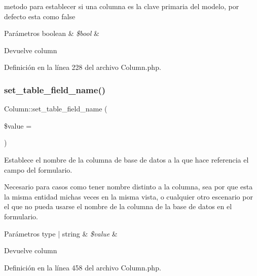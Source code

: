 metodo para establecer si una columna es la clave primaria del modelo, por defecto esta como false


\begin{DoxyParams}[1]{Parámetros}
boolean & {\em \$bool} & \\
\hline
\end{DoxyParams}
\begin{DoxyReturn}{Devuelve}
column 
\end{DoxyReturn}


Definición en la línea 228 del archivo Column.\+php.

\mbox{\label{class_column_a314eeaf954a8c2607626f9c742a9f579}} 
\subsubsection{\texorpdfstring{set\_table\_field\_name()}{set\_table\_field\_name()}}
{\footnotesize\ttfamily Column\+::set\+\_\+table\+\_\+field\+\_\+name (\begin{DoxyParamCaption}\item[{}]{\$value = {\ttfamily \textquotesingle{}\textquotesingle{}} }\end{DoxyParamCaption})}

Establece el nombre de la columna de base de datos a la que hace referencia el campo del formulario.

Necesario para casos como tener nombre distinto a la columna, sea por que esta la misma entidad michas veces en la misma vista, o cualquier otro escenario por el que no pueda usarse el nombre de la columna de la base de datos en el formulario.


\begin{DoxyParams}[1]{Parámetros}
type | string & {\em \$value} & \\
\hline
\end{DoxyParams}
\begin{DoxyReturn}{Devuelve}
column 
\end{DoxyReturn}


Definición en la línea 458 del archivo Column.\+php.

\mbox{\label{class_column_a7500d02a0114cde3ddb200143d39a2a0}} 
